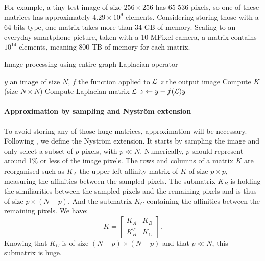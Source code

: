 For example, a tiny test image of size \(256 \times 256\) has 65 536 pixels, so one of these matrices has approximately \(4.29 \times 10^9\) elements.
Considering storing those with a 64 bits type, one matrix takes more than 34 GB of memory.
Scaling to an everyday-smartphone picture, taken with a 10 MPixel camera, a matrix contains \(10^{14}\) elements, meaning 800 TB of memory for each matrix.

\begin{algorithm}[H]
 \caption{Image processing using entire graph Laplacian operator}
 \begin{algorithmic}
  \REQUIRE \(y\) an image of size \(N\), \(f\) the function applied to \(\operatorname{\mathcal{L}}\)
  \ENSURE \(z\) the output image
  \STATE Compute \(K\) (size \(N \times N\))
  \STATE Compute Laplacian matrix \(\operatorname{\mathcal{L}}\)
  \STATE \(z \leftarrow y - f(\operatorname{\mathcal{L}}) y\)
 \end{algorithmic}
\end{algorithm}

\paragraph{Approximation by sampling and Nystr\"om extension}

To avoid storing any of those huge matrices, approximation will be necessary.
Following \cite{fowlkes_spectral_2004}, we define the Nystr\"om extension.
It starts by sampling the image and only select a subset of \(p\) pixels, with \(p \ll N\).
Numerically, \(p\) should represent around 1\% or less of the image pixels.
The rows and columns of a matrix \(K\) are reorganised such as \(K_A\) the upper left affinity matrix of \(K\) of size \(p \times p\), measuring the affinities between the sampled pixels.
The submatrix \(K_B\) is holding the similiarities between the sampled pixels and the remaining pixels and is thus of size \(p \times (N-p)\).
And the submatrix \(K_C\) containing the affinities between the remaining pixels.
We have:
\[K = \begin{bmatrix}K_A & K_B \\ K_B^T & K_C\end{bmatrix}.\]
Knowing that \(K_C\) is of size \((N-p) \times (N-p)\) and that \(p \ll N\), this submatrix is huge.

